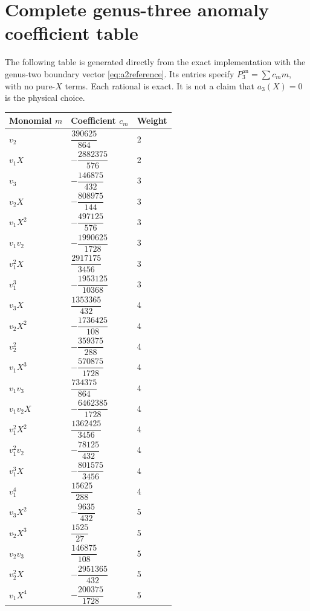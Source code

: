\documentclass[11pt,a4paper]{article}
\numberwithin{equation}{section}
\newcommand{\an}{\mathrm{an}}
\begin{document}
\section{Complete genus-three anomaly coefficient table}
\label{app:g3}
The following table is generated directly from the exact implementation with
the genus-two boundary vector \eqref{eq:a2reference}. Its entries specify
$P_3^{\an}=\sum c_m m$, with no pure-$X$ terms. Each rational is exact.
It is not a claim that $a_3(X)=0$ is the physical choice.
\begingroup\renewcommand{\arraystretch}{1.5}\setlength{\extrarowheight}{3pt}
\begin{longtable}{lll}
\toprule
Monomial $m$ & Coefficient $c_m$ & Weight\\
\midrule\endhead
$v_2$ & $\dfrac{390625}{864}$ & 2 \\
$v_1 X$ & $-\dfrac{2882375}{576}$ & 2 \\
$v_3$ & $-\dfrac{146875}{432}$ & 3 \\
$v_2 X$ & $-\dfrac{808975}{144}$ & 3 \\
$v_1 X^{2}$ & $-\dfrac{497125}{576}$ & 3 \\
$v_1 v_2$ & $-\dfrac{1990625}{1728}$ & 3 \\
$v_1^{2} X$ & $\dfrac{2917175}{3456}$ & 3 \\
$v_1^{3}$ & $-\dfrac{1953125}{10368}$ & 3 \\
$v_3 X$ & $\dfrac{1353365}{432}$ & 4 \\
$v_2 X^{2}$ & $-\dfrac{1736425}{108}$ & 4 \\
$v_2^{2}$ & $-\dfrac{359375}{288}$ & 4 \\
$v_1 X^{3}$ & $-\dfrac{570875}{1728}$ & 4 \\
$v_1 v_3$ & $\dfrac{734375}{864}$ & 4 \\
$v_1 v_2 X$ & $-\dfrac{6462385}{1728}$ & 4 \\
$v_1^{2} X^{2}$ & $\dfrac{1362425}{3456}$ & 4 \\
$v_1^{2} v_2$ & $-\dfrac{78125}{432}$ & 4 \\
$v_1^{3} X$ & $-\dfrac{801575}{3456}$ & 4 \\
$v_1^{4}$ & $\dfrac{15625}{288}$ & 4 \\
$v_3 X^{2}$ & $-\dfrac{9635}{432}$ & 5 \\
$v_2 X^{3}$ & $\dfrac{1525}{27}$ & 5 \\
$v_2 v_3$ & $\dfrac{146875}{108}$ & 5 \\
$v_2^{2} X$ & $-\dfrac{2951365}{432}$ & 5 \\
$v_1 X^{4}$ & $-\dfrac{200375}{1728}$ & 5 \\

\end{longtable}
\end{document}
